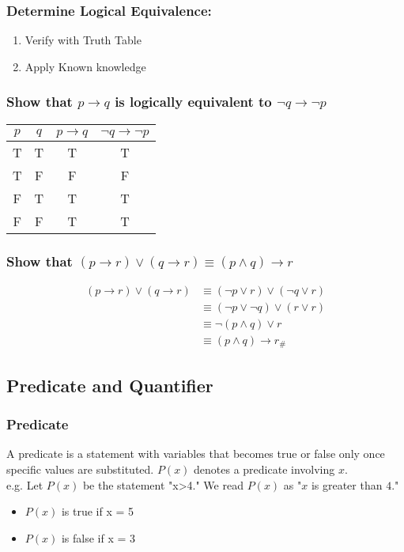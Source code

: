 \documentclass[11pt]{article}
\begin{document}
\subsubsection{Determine Logical Equivalence: }
\begin{enumerate}
    \item Verify with Truth Table
    \item Apply Known knowledge
\end{enumerate}
\subsubsection*{Show that $p\rightarrow q$ is logically equivalent to $\lnot q \rightarrow \lnot p$}
\begin{table}[H]
    \centering
    \begin{tabular}{c|c|c|c}
        $p$ & $q$ & $p \rightarrow q$ & $\lnot q\rightarrow \lnot p$ \\
        \hline
        T & T & T & T\\
        T & F & F & F\\
        F & T & T & T\\
        F & F & T & T\\
    \end{tabular}
\end{table}
\subsubsection*{Show that $(p\rightarrow r)\lor (q\rightarrow r) \equiv (p\land q)\rightarrow r$}
\begin{align*}
    (p\rightarrow r)\lor (q\rightarrow r) &\equiv(\lnot p \lor r)\lor (\lnot q \lor r)\\
    &\equiv(\lnot p \lor \lnot q)\lor(r\lor r)\\
    &\equiv\lnot(p\land q) \lor r\\
    &\equiv (p\land q)\rightarrow r _\#
\end{align*}
\subsection{Predicate and Quantifier}
\subsubsection{Predicate}
A predicate is a statement with variables that becomes true or false only once specific values are substituted. $P(x)$ denotes a predicate involving $x$.\\
e.g. Let $P(x)$ be the statement "x>4." We read $P(x)$ as "$x$ is greater than $4$."
\begin{itemize}
    \item $P(x)$ is true if x = 5
    \item $P(x)$ is false if x = 3
\end{itemize}
\end{document}
